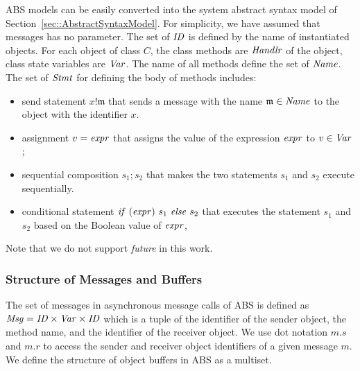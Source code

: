 ABS models can be easily converted into the system abstract syntax model of Section~\ref{sec::AbstractSyntaxModel}. For simplicity, we have assumed that messages has no parameter. The set of $\mathit{ID}$ is defined by the name of instantiated objects. For each object of class $C$, the class methods are $\mathit{Handlr}$ of the object, class state variables are $\mathit{Var}$. The name of all methods define the set of $\mathit{Name}$. The set of $\mathit{Stmt}$ for defining the body of methods includes:\begin{itemize}
    \item send statement $x!\mathfrak{m}$ that sends a message with the name $\mathfrak{m}\in\mathit{Name}$ to the object with the identifier $x$.
    \item assignment $v={\it expr}$ that assigns the value of the expression ${\it expr}$ to $v\in\mathit{Var}$;
    \item sequential composition $s_1;s_2$ that makes the two statements $s_1$ and $s_2$ execute sequentially.
    \item conditional statement ${\it if}~ (\mathit{expr}) ~s_1 ~{\it else}~s_2 $ that executes the statement $s_1$ and $s_2$ based on the Boolean value of $\mathit{expr}$,
\end{itemize}
Note that we do not support \emph{future} in this work.

\subsubsection{Structure of Messages and Buffers}
The set of messages in asynchronous message calls of ABS is defined as $\mathit{Msg} = \mathit{ID} \times \mathit{Var} \times \mathit{ID}$ which is a tuple of the identifier of the sender object, the method name, and the identifier of the receiver object. We use dot notation $m.s$ and $m.r$ to access the sender and receiver object identifiers of a given message $m$. We define the structure of object buffers in ABS as a multiset.


